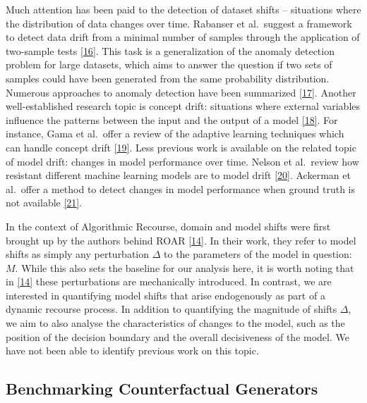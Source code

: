 \documentclass[conference,final,]{IEEEtran}
\theoremstyle{definition}
\theoremstyle{definition}
\theoremstyle{definition}
\theoremstyle{definition}
\theoremstyle{remark}
\begin{document}
Much attention has been paid to the detection of dataset shifts -- situations where the distribution of data changes over time. Rabanser et al.~suggest a framework to detect data drift from a minimal number of samples through the application of two-sample tests \protect\hyperlink{ref-rabanser2019failing}{{[}16{]}}. This task is a generalization of the anomaly detection problem for large datasets, which aims to answer the question if two sets of samples could have been generated from the same probability distribution. Numerous approaches to anomaly detection have been summarized \protect\hyperlink{ref-chandola2009anomaly}{{[}17{]}}. Another well-established research topic is concept drift: situations where external variables influence the patterns between the input and the output of a model \protect\hyperlink{ref-widmer1996learning}{{[}18{]}}. For instance, Gama et al.~offer a review of the adaptive learning techniques which can handle concept drift \protect\hyperlink{ref-gama2014survey}{{[}19{]}}. Less previous work is available on the related topic of model drift: changes in model performance over time. Nelson et al.~review how resistant different machine learning models are to model drift \protect\hyperlink{ref-nelson2015evaluating}{{[}20{]}}. Ackerman et al.~offer a method to detect changes in model performance when ground truth is not available \protect\hyperlink{ref-ackerman2021machine}{{[}21{]}}.

In the context of Algorithmic Recourse, domain and model shifts were first brought up by the authors behind ROAR \protect\hyperlink{ref-upadhyay2021robust}{{[}14{]}}. In their work, they refer to model shifts as simply any perturbation \(\Delta\) to the parameters of the model in question: \(M\). While this also sets the baseline for our analysis here, it is worth noting that in \protect\hyperlink{ref-upadhyay2021robust}{{[}14{]}} these perturbations are mechanically introduced. In contrast, we are interested in quantifying model shifts that arise endogenously as part of a dynamic recourse process. In addition to quantifying the magnitude of shifts \(\Delta\), we aim to also analyse the characteristics of changes to the model, such as the position of the decision boundary and the overall decisiveness of the model. We have not been able to identify previous work on this topic.

\hypertarget{related-benchmark}{%
\subsection{Benchmarking Counterfactual Generators}\label{related-benchmark}}
\end{document}
